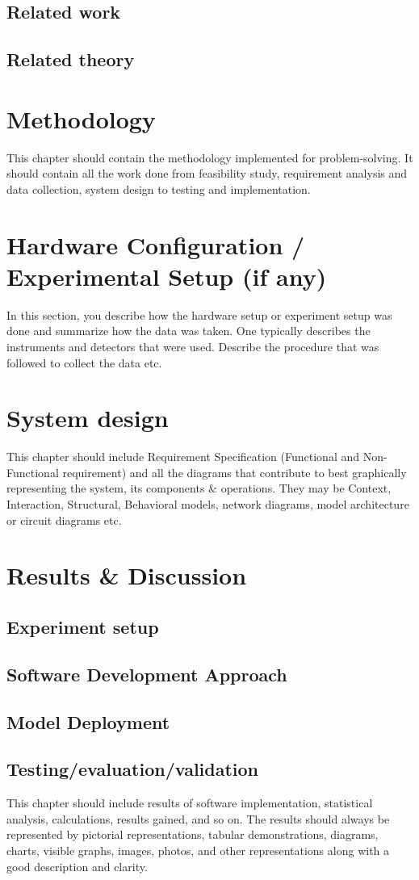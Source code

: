 \documentclass[12pt]{report}
\begin{document}
\section{Related work}
\section{Related theory}
\chapter{Methodology}
This chapter should contain the methodology implemented for problem-solving. It should contain all the work done from feasibility study, requirement analysis and data collection, system design to testing and implementation.
\chapter{Hardware Configuration / Experimental Setup (if any)}
In this section, you describe how the hardware setup or experiment setup was done and summarize how the data was taken. One typically describes the instruments and detectors that were used. Describe the procedure that was followed to collect the data etc.
\chapter{System design}
This chapter should include Requirement Specification (Functional and Non- Functional requirement) and all the diagrams that contribute to best graphically representing the system, its components \& operations. They may be Context, Interaction, Structural, Behavioral models, network diagrams, model architecture or circuit diagrams etc.
\chapter{Results \& Discussion}
\section{Experiment setup}
\section{Software Development Approach}
\section{Model Deployment}
\section{Testing/evaluation/validation}
This chapter should include results of software implementation, statistical analysis, calculations, results gained, and so on. The results should always be represented by pictorial representations, tabular demonstrations, diagrams, charts, visible graphs, images, photos, and other representations along with a good description and clarity.
\end{document}
